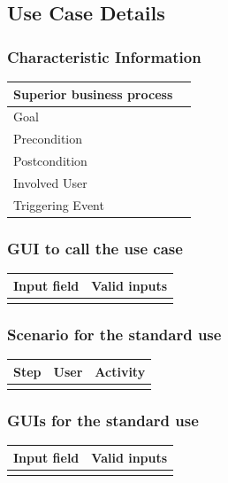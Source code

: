 \documentclass[12pt]{article}
\theoremstyle{definition}
\begin{document}
\subsection{Use Case Details}

\subsubsection{Characteristic Information}

\begin{tabular}{|l|l|}
\hline
Superior business process &  \\ \hline
Goal &  \\ \hline
Precondition &  \\ \hline
Postcondition &  \\ \hline
Involved User &  \\ \hline
Triggering Event &  \\ \hline
\end{tabular}


\subsubsection{GUI to call the use case}

\begin{tabular}{|l|l|}
\hline
Input field & Valid inputs \\ \hline
 &  \\ \hline
\end{tabular}

\subsubsection{Scenario for the standard use}

\begin{tabular}{|l|l|l|}
\hline
Step & User & Activity \\ \hline
 & & \\ \hline
\end{tabular}

\subsubsection{GUIs for the standard use}

\begin{tabular}{|l|l|}
\hline
Input field & Valid inputs \\ \hline
 &  \\ \hline
\end{tabular}
\end{document}
